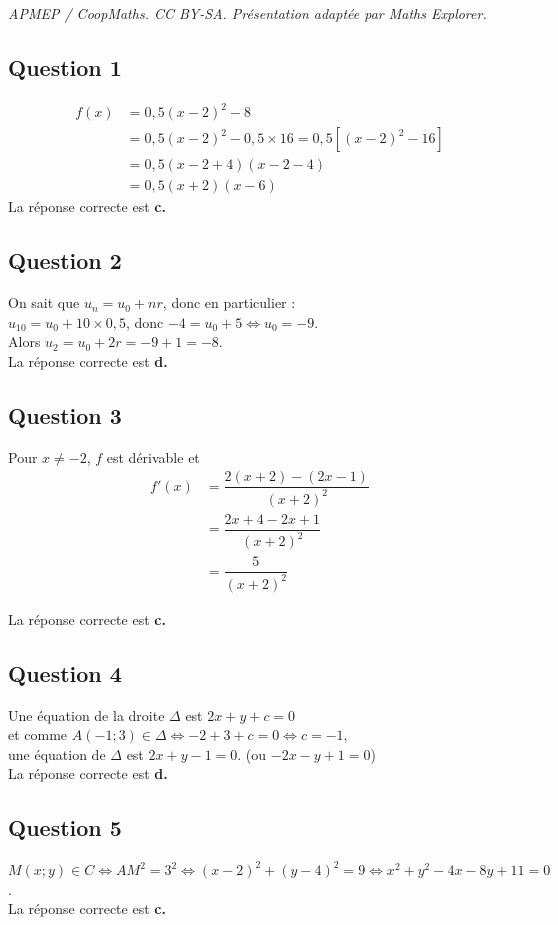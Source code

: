 \documentclass[10pt]{article}
\begin{document}
\noindent\textit{APMEP / CoopMaths. CC BY-SA. Présentation adaptée par Maths Explorer.}\par\medskip
\subsection*{Question 1}
	
	
\begin{align*}
	f(x)& = 0,5(x - 2)^2 - 8\\
	& = 0,5(x - 2)^2 - 0,5 \times 16 = 0,5 \left[ (x - 2)^2 - 16 \right] \\
	&= 0,5(x - 2 + 4)(x - 2 - 4)\\
	& = 0,5(x + 2)(x - 6)
\end{align*}
La réponse correcte est \textbf{c.}
	
	\subsection*{Question 2}
On sait que $u_n = u_0 + nr$, donc en particulier :\\
$u_{10} = u_0 + 10 \times 0,5$, donc $-4 = u_0 + 5 \iff u_0 = -9$.\\
 Alors $u_2 = u_0 + 2r = -9 + 1 = -8$.\\
La réponse correcte est \textbf{d.}
	
	\subsection*{Question 3}
	
Pour $x \neq -2$, $f$ est dérivable et
\begin{align*}
	f'(x) &= \dfrac{2(x + 2) - (2x - 1)}{(x + 2)^2}\\
	& = \dfrac{2x + 4 - 2x + 1}{(x + 2)^2} \\
	&= \dfrac{5}{(x + 2)^2}
\end{align*}
	
	La réponse correcte est \textbf{c.}
	
	\subsection*{Question 4}
Une équation de la droite $\Delta$ est $2x + y + c = 0$ \\
et comme $A(-1 ; 3) \in \Delta \iff -2 + 3 + c = 0 \iff c = -1$, \\
une équation de $\Delta$ est $2x + y - 1 = 0$. (ou $-2x - y + 1 = 0$)\\
La réponse correcte est \textbf{d.}
	
	\subsection*{Question 5}
$M(x ; y) \in C \iff AM^2 = 3^2 \iff (x - 2)^2 + (y - 4)^2 = 9 \iff x^2 + y^2 - 4x - 8y + 11 = 0$.\\La réponse correcte est \textbf{c.}
\end{document}
